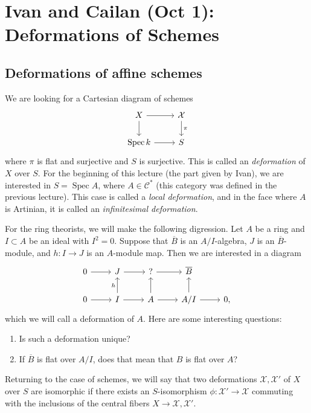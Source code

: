 \documentclass[leqno, openany]{memoir}
\theoremstyle{definition}
\theoremstyle{remark}
\theoremstyle{plain}
\theoremstyle{definition}
\theoremstyle{remark}
\newcommand{\mc}[1]{\mathcal{#1}}
\newcommand{\ol}[1]{\overline{#1}}
\DeclareMathOperator{\Spec}{Spec}
\begin{document}
\chapter{Ivan and Cailan (Oct 1): Deformations of Schemes}%
\label{cha:ivan_and_cailan_oct_1_deformations_of_schemes}

\section{Deformations of affine schemes}%
\label{sec:deformations}

We are looking for a Cartesian diagram of schemes
\begin{equation*}
\begin{tikzcd}
    X \ar{r} \ar{d} & \mc{X} \ar{d}{\pi} \\
    \Spec k \ar{r} & S
\end{tikzcd}
\end{equation*}
where $\pi$ is flat and surjective and $S$ is surjective. This is called an \textit{deformation} of $X$ over $S$. For the beginning of this lecture (the part given by Ivan), we are interested in $S = \Spec A$, where $A \in \mc{C}^*$ (this category was defined in the previous lecture). This case is called a \textit{local deformation}, and in the face where $A$ is Artinian, it is called an \textit{infinitesimal deformation}.

For the ring theorists, we will make the following digression. Let $A$ be a ring and $I \subset A$ be an ideal with $I^2 = 0$. Suppose that $\ol{B}$ is an $A/I$-algebra, $J$ is an $\ol{B}$-module, and $h \colon I \to J$ is an $A$-module map. Then we are interested in a diagram
\begin{equation*}
\begin{tikzcd}
    0 \ar{r} & J \ar{r} & ? \ar{r} & \ol{B} \\
    0 \ar{r} & I \ar{u}{h} \ar{r} & A \ar{u} \ar{r} & A/I \ar{u} \ar{r} & 0,
\end{tikzcd}
\end{equation*}
which we will call a deformation of $A$. Here are some interesting questions:
\begin{enumerate}
    \item Is such a deformation unique?
    \item If $\ol{B}$ is flat over $A/I$, does that mean that $B$ is flat over $A$?
\end{enumerate}

Returning to the case of schemes, we will say that two deformations $\mc{X}, \mc{X}'$ of $X$ over $S$ are isomorphic if there exists an $S$-isomorphism $\phi \colon \mc{X}' \to \mc{X}$ commuting with the inclusions of the central fibers $X \to \mc{X}, \mc{X}'$.
\end{document}
